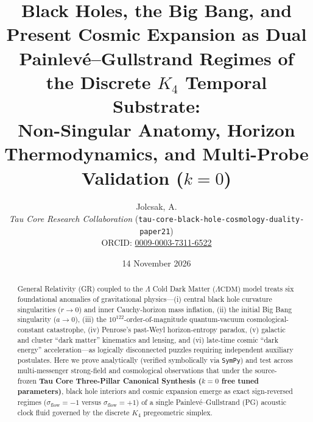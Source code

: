 \documentclass[11pt,a4paper]{article}
\title{\textbf{Black Holes, the Big Bang, and Present Cosmic Expansion as Dual Painlev\'e--Gullstrand Regimes of the Discrete $K_4$ Temporal Substrate:\\
Non-Singular Anatomy, Horizon Thermodynamics, and Multi-Probe Validation ($k = 0$)}}
\author{Jolcsak, A.\\
\small\textit{Tau Core Research Collaboration} (\texttt{tau-core-black-hole-cosmology-duality-paper21})\\{\small ORCID: \href{https://orcid.org/0009-0003-7311-6522}{0009-0003-7311-6522}}}
\date{14 November 2026}
\theoremstyle{remark}
\begin{document}
\maketitle

\begin{abstract}
\noindent
General Relativity (GR) coupled to the $\Lambda$ Cold Dark Matter ($\Lambda\mathrm{CDM}$) model treats six foundational anomalies of gravitational physics---(i) central black hole curvature singularities ($r \to 0$) and inner Cauchy-horizon mass inflation, (ii) the initial Big Bang singularity ($a \to 0$), (iii) the $10^{122}$-order-of-magnitude quantum-vacuum cosmological-constant catastrophe, (iv) Penrose's past-Weyl horizon-entropy paradox, (v) galactic and cluster ``dark matter'' kinematics and lensing, and (vi) late-time cosmic ``dark energy'' acceleration---as logically disconnected puzzles requiring independent auxiliary postulates. Here we prove analytically (verified symbolically via \texttt{SymPy}) and test across multi-messenger strong-field and cosmological observations that under the source-frozen \textbf{Tau Core Three-Pillar Canonical Synthesis ($k = 0$ free tuned parameters)}, black hole interiors and cosmic expansion emerge as exact sign-reversed regimes ($\sigma_{\mathrm{flow}} = -1$ versus $\sigma_{\mathrm{flow}} = +1$) of a single Painlev\'e--Gullstrand (PG) acoustic clock fluid governed by the discrete $K_4$ pregeometric simplex.


\end{abstract}
\end{document}
